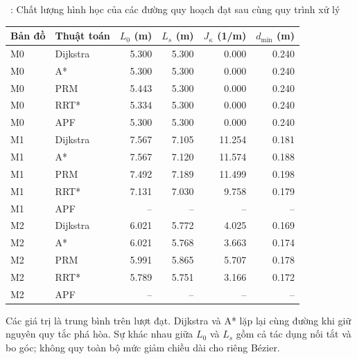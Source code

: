 \begin{center}
\begin{minipage}{\linewidth}
  \centering
  \singlespacing
  \label{tab:chat-luong-duong-ch3}
  \tablename~\thetable: Chất lượng hình học của các đường quy hoạch đạt sau cùng quy trình xử lý\par\smallskip
  \small
  \renewcommand{\arraystretch}{1.16}
  \begin{tabular}{@{}llrrrr@{}}
    \toprule
    \textbf{Bản đồ} & \textbf{Thuật toán} & \(L_0\) \textbf{(m)} & \(L_s\) \textbf{(m)} & \(J_\kappa\) \textbf{(1/m)} & \(d_{\min}\) \textbf{(m)}\\
    \midrule
    M0 & Dijkstra & 5.300 & 5.300 & 0.000 & 0.240\\
    M0 & A* & 5.300 & 5.300 & 0.000 & 0.240\\
    M0 & PRM & 5.443 & 5.300 & 0.000 & 0.240\\
    M0 & RRT* & 5.334 & 5.300 & 0.000 & 0.240\\
    M0 & APF & 5.300 & 5.300 & 0.000 & 0.240\\
    \midrule
    M1 & Dijkstra & 7.567 & 7.105 & 11.254 & 0.181\\
    M1 & A* & 7.567 & 7.120 & 11.574 & 0.188\\
    M1 & PRM & 7.492 & 7.189 & 11.499 & 0.198\\
    M1 & RRT* & 7.131 & 7.030 & 9.758 & 0.179\\
    M1 & APF & -- & -- & -- & --\\
    \midrule
    M2 & Dijkstra & 6.021 & 5.772 & 4.025 & 0.169\\
    M2 & A* & 6.021 & 5.768 & 3.663 & 0.174\\
    M2 & PRM & 5.991 & 5.865 & 5.707 & 0.178\\
    M2 & RRT* & 5.789 & 5.751 & 3.166 & 0.172\\
    M2 & APF & -- & -- & -- & --\\
    \bottomrule
  \end{tabular}
  \par\smallskip
  \begin{minipage}{0.96\linewidth}
    \footnotesize Các giá trị là trung bình trên lượt đạt. Dijkstra và A* lặp lại cùng đường khi giữ nguyên quy tắc phá hòa. Sự khác nhau giữa \(L_0\) và \(L_s\) gồm cả tác dụng nối tắt và bo góc; không quy toàn bộ mức giảm chiều dài cho riêng Bézier.
  \end{minipage}
\end{minipage}
\end{center}

